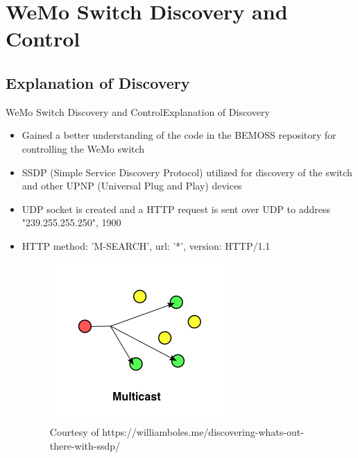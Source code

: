 \documentclass{beamer}
\begin{document}
\section{WeMo Switch Discovery and Control}
\subsection{Explanation of Discovery}
\begin{frame}{WeMo Switch Discovery and Control}{Explanation of Discovery}
\begin{itemize}
\item Gained a better understanding of the code in the BEMOSS repository for controlling the WeMo switch
\item SSDP (Simple Service Discovery Protocol) utilized for discovery of the switch and other UPNP (Universal Plug and Play) devices
\item UDP socket is created and a HTTP request is sent over UDP to address "239.255.255.250", 1900
\item HTTP method: 'M-SEARCH', url: '*', version: HTTP/1.1
\begin{figure}
\includegraphics[scale=0.3]{../figs/img/multicast_routing_diagram}
\caption{Courtesy of https://williamboles.me/discovering-whats-out-there-with-ssdp/}
\end{figure}
\end{itemize}
\end{frame}
\end{document}
